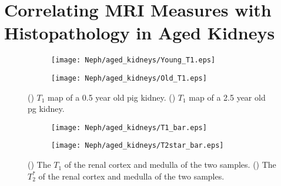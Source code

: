\section{Correlating MRI Measures with Histopathology in Aged Kidneys}

\begin{figure}[H]
	\centering
	\begin{subfigure}[c]{0.47\textwidth}
		\centering
		\texttt{[image: Neph/aged\_kidneys/Young\_T1.eps]}
		\caption{}
		\label{fig:ex_aged_t1_map}
	\end{subfigure}
	\hfill
	\begin{subfigure}[c]{0.47\textwidth}
		\centering
		\texttt{[image: Neph/aged\_kidneys/Old\_T1.eps]}
		\caption{}
		\label{fig:ex_aged_t2star_map}
	\end{subfigure}
	\caption{() $T_1$ map of a 0.5 year old pig kidney. () $T_1$ map of a 2.5 year old pg kidney.}
	\label{fig:ex_aged_map}
\end{figure}

\begin{figure}[H]
	\centering
	\begin{subfigure}[c]{0.47\textwidth}
		\centering
		\texttt{[image: Neph/aged\_kidneys/T1\_bar.eps]}
		\caption{}
		\label{fig:ex_aged_t1_bar}
	\end{subfigure}
	\hfill
	\begin{subfigure}[c]{0.47\textwidth}
		\centering
		\texttt{[image: Neph/aged\_kidneys/T2star\_bar.eps]}
		\caption{}
		\label{fig:ex_aged_t2star_bar}
	\end{subfigure}
	\caption{() The $T_1$ of the renal cortex and medulla of the two samples. () The $T_2^*$ of the renal cortex and medulla of the two samples.}
	\label{fig:ex_aged_bar}
\end{figure}

